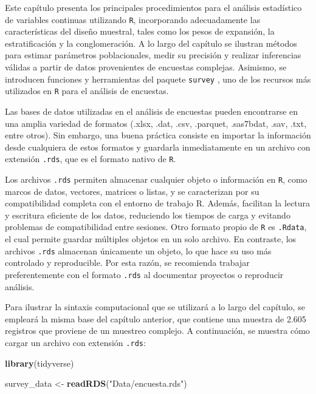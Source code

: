 \documentclass[
  spanish,
  12pt,
]{book}
\newenvironment{Shaded}{\begin{snugshade}}{\end{snugshade}}
\newcommand{\FunctionTok}[1]{\textcolor[rgb]{0.13,0.29,0.53}{\textbf{#1}}}
\newcommand{\NormalTok}[1]{#1}
\newcommand{\OtherTok}[1]{\textcolor[rgb]{0.56,0.35,0.01}{#1}}
\newcommand{\StringTok}[1]{\textcolor[rgb]{0.31,0.60,0.02}{#1}}
\begin{document}
Este capítulo presenta los principales procedimientos para el análisis estadístico de variables continuas utilizando \texttt{R}, incorporando adecuadamente las características del diseño muestral, tales como los pesos de expansión, la estratificación y la conglomeración. A lo largo del capítulo se ilustran métodos para estimar parámetros poblacionales, medir su precisión y realizar inferencias válidas a partir de datos provenientes de encuestas complejas. Asimismo, se introducen funciones y herramientas del paquete \texttt{survey} \citep{Lumley2024}, uno de los recursos más utilizados en \texttt{R} para el análisis de encuestas.

Las bases de datos utilizadas en el análisis de encuestas pueden encontrarse en una amplia variedad de formatos (.xlsx, .dat, .csv, .parquet, .sas7bdat, .sav, .txt, entre otros). Sin embargo, una buena práctica consiste en importar la información desde cualquiera de estos formatos y guardarla inmediatamente en un archivo con extensión \texttt{.rds}, que es el formato nativo de \texttt{R}.

Los archivos \texttt{.rds} permiten almacenar cualquier objeto o información en \texttt{R}, como marcos de datos, vectores, matrices o listas, y se caracterizan por su compatibilidad completa con el entorno de trabajo R. Además, facilitan la lectura y escritura eficiente de los datos, reduciendo los tiempos de carga y evitando problemas de compatibilidad entre sesiones. Otro formato propio de \texttt{R} es \texttt{.Rdata}, el cual permite guardar múltiples objetos en un solo archivo. En contraste, los archivos \texttt{.rds} almacenan únicamente un objeto, lo que hace su uso más controlado y reproducible. Por esta razón, se recomienda trabajar preferentemente con el formato \texttt{.rds} al documentar proyectos o reproducir análisis.

Para ilustrar la sintaxis computacional que se utilizará a lo largo del capítulo, se empleará la misma base del capítulo anterior, que contiene una muestra de 2.605 registros que proviene de un muestreo complejo. A continuación, se muestra cómo cargar un archivo con extensión \texttt{.rds}:

\begin{Shaded}
\begin{Highlighting}[]
\FunctionTok{library}\NormalTok{(tidyverse)}

\NormalTok{survey\_data }\OtherTok{\textless{}{-}} \FunctionTok{readRDS}\NormalTok{(}\StringTok{"Data/encuesta.rds"}\NormalTok{)}
\end{Highlighting}
\end{Shaded}
\end{document}
